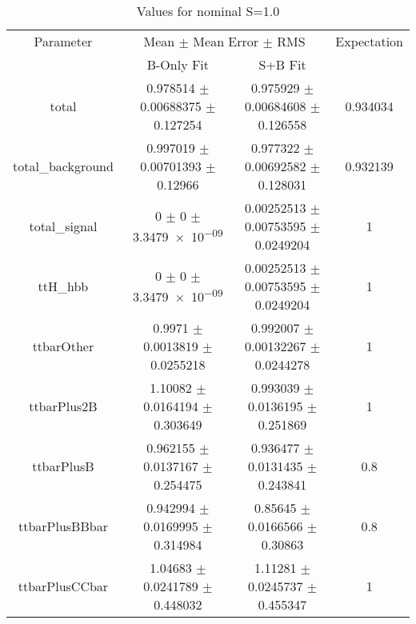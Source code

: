 \begin{table}
\centering
\caption{Values for nominal S=1.0}
\begin{tabular}{cccc}
\toprule
Parameter & \multicolumn{2}{c}{Mean $\pm$ Mean Error $\pm$ RMS} & Expectation\\
 & B-Only Fit & S+B Fit & \\
\midrule
total & \num{0.978514} $\pm$ \num{0.00688375} $\pm$ \num{0.127254} & \num{0.975929} $\pm$ \num{0.00684608} $\pm$ \num{0.126558} & \num{0.934034}\\
total\_background & \num{0.997019} $\pm$ \num{0.00701393} $\pm$ \num{0.12966} & \num{0.977322} $\pm$ \num{0.00692582} $\pm$ \num{0.128031} & \num{0.932139}\\
total\_signal & \num{0} $\pm$ \num{0} $\pm$ \num{3.3479e-09} & \num{0.00252513} $\pm$ \num{0.00753595} $\pm$ \num{0.0249204} & \num{1}\\
ttH\_hbb & \num{0} $\pm$ \num{0} $\pm$ \num{3.3479e-09} & \num{0.00252513} $\pm$ \num{0.00753595} $\pm$ \num{0.0249204} & \num{1}\\
ttbarOther & \num{0.9971} $\pm$ \num{0.0013819} $\pm$ \num{0.0255218} & \num{0.992007} $\pm$ \num{0.00132267} $\pm$ \num{0.0244278} & \num{1}\\
ttbarPlus2B & \num{1.10082} $\pm$ \num{0.0164194} $\pm$ \num{0.303649} & \num{0.993039} $\pm$ \num{0.0136195} $\pm$ \num{0.251869} & \num{1}\\
ttbarPlusB & \num{0.962155} $\pm$ \num{0.0137167} $\pm$ \num{0.254475} & \num{0.936477} $\pm$ \num{0.0131435} $\pm$ \num{0.243841} & \num{0.8}\\
ttbarPlusBBbar & \num{0.942994} $\pm$ \num{0.0169995} $\pm$ \num{0.314984} & \num{0.85645} $\pm$ \num{0.0166566} $\pm$ \num{0.30863} & \num{0.8}\\
ttbarPlusCCbar & \num{1.04683} $\pm$ \num{0.0241789} $\pm$ \num{0.448032} & \num{1.11281} $\pm$ \num{0.0245737} $\pm$ \num{0.455347} & \num{1}\\
\bottomrule
\end{tabular}
\end{table}